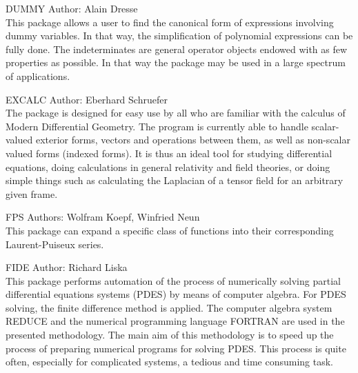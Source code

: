 \begin{Package}{DUMMY}
Author: Alain Dresse\\

This package allows a user to find the canonical form of expressions
involving dummy variables. In that way, the simplification of
polynomial expressions can be fully done. The indeterminates are general
operator objects endowed with as few properties as possible. In that way
the package may be used in a large spectrum of applications.
\end{Package}

\begin{Package}{EXCALC}
Author: Eberhard Schruefer\\

The  package is designed for easy use by all who are familiar
with the calculus of Modern Differential Geometry.  The program is currently
able to handle scalar-valued exterior forms, vectors and operations between
them, as well as non-scalar valued forms (indexed forms).  It is thus an ideal
tool for studying differential equations, doing calculations in general
relativity and field theories, or doing simple things such as calculating the
Laplacian of a tensor field for an arbitrary given frame. 
\end{Package}

\begin{Package}{FPS}
 
Authors: Wolfram Koepf, Winfried Neun\\

This package can expand a specific class of functions into their
corresponding Laurent-Puiseux series.
\end{Package}

\begin{Package}{FIDE}
Author:  Richard Liska\\

This package performs  automation of  the process of numerically
solving  partial  differential  equations  systems  (PDES)  by  means of
computer algebra.  For PDES solving, the finite difference method is applied.
The  computer  algebra  system  REDUCE  and  the  numerical  programming
language FORTRAN  are used in the presented methodology. The main aim of
this methodology is to speed up the process of preparing numerical
programs for  solving PDES.  This process is quite often, especially for
complicated systems, a tedious and time consuming task.
\end{Package}

